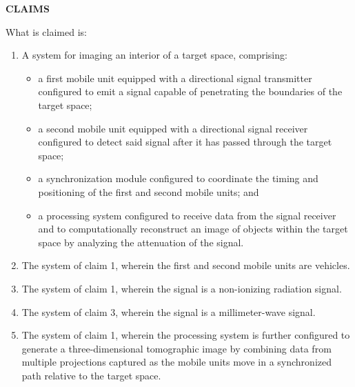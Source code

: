 \documentclass[11pt,letterpaper]{article}
\begin{document}
\thispagestyle{empty}

\begin{center}
    \textbf{\large CLAIMS}
\end{center}

\vspace{0.4cm}
\noindent What is claimed is:

\begin{enumerate}[label=\textbf{\arabic*.}, leftmargin=0.5in, itemsep=0.4cm]
    \item A system for imaging an interior of a target space, comprising:
    \begin{itemize}[leftmargin=0.3in, noitemsep]
        \item a first mobile unit equipped with a directional signal transmitter configured to emit a signal capable of penetrating the boundaries of the target space;
        \item a second mobile unit equipped with a directional signal receiver configured to detect said signal after it has passed through the target space;
        \item a synchronization module configured to coordinate the timing and positioning of the first and second mobile units; and
        \item a processing system configured to receive data from the signal receiver and to computationally reconstruct an image of objects within the target space by analyzing the attenuation of the signal.
    \end{itemize}

    \item The system of claim 1, wherein the first and second mobile units are vehicles.

    \item The system of claim 1, wherein the signal is a non-ionizing radiation signal.

    \item The system of claim 3, wherein the signal is a millimeter-wave signal.

    \item The system of claim 1, wherein the processing system is further configured to generate a three-dimensional tomographic image by combining data from multiple projections captured as the mobile units move in a synchronized path relative to the target space.


\end{enumerate}
\end{document}
